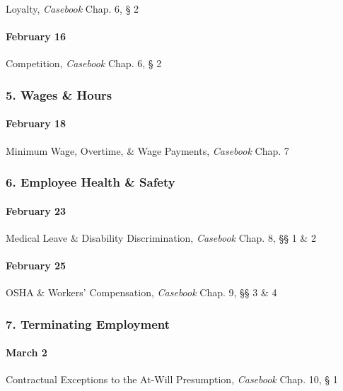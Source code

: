\documentclass[11pt,letterpaper,twoside]{article}
\begin{document}
Loyalty, \emph{Casebook} Chap. 6, § 2

\paragraph{February 16}\label{february-16}

Competition, \emph{Casebook} Chap. 6, § 2

\subsubsection{5. Wages \& Hours}\label{wages-hours}

\paragraph{February 18}\label{february-18}

Minimum Wage, Overtime, \& Wage Payments, \emph{Casebook} Chap. 7

\subsubsection{6. Employee Health \&
Safety}\label{employee-health-safety}

\paragraph{February 23}\label{february-23}

Medical Leave \& Disability Discrimination, \emph{Casebook} Chap. 8, §§
1 \& 2

\paragraph{February 25}\label{february-25}

OSHA \& Workers' Compensation, \emph{Casebook} Chap. 9, §§ 3 \& 4

\subsubsection{7. Terminating Employment}\label{terminating-employment}

\paragraph{March 2}\label{march-2}

Contractual Exceptions to the At-Will Presumption, \emph{Casebook} Chap.
10, § 1
\end{document}
